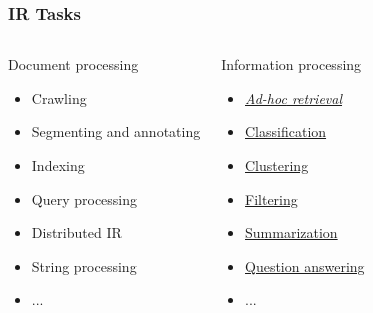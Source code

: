 \documentclass[svgnames]{beamer}
\begin{document}
\begin{frame}
  \frametitle{IR Tasks}

  \begin{columns}[t]


    \begin{block}{Document processing}
      \begin{itemize}
      \item Crawling
      \item Segmenting and annotating
      \item Indexing
      \item Query processing
      \item Distributed IR
      \item String processing
      \item ...
      \end{itemize}
    \end{block}


    \begin{block}{Information processing}
      \begin{itemize}
      \item \emph{\href{http://www.google.com}{\textit{Ad-hoc} retrieval}}
      \item \href{http://www.dmoz.org/}{Classification}
      \item \href{http://vivisimo.com/}{Clustering}
      \item \href{http://www.last.fm/}{Filtering}
      \item \href{http://textsummarization.net}{Summarization}
      \item \href{http://www.ibm.com/watson/}{Question answering}
      \item ...
      \end{itemize}
    \end{block}

  \end{columns}
\end{frame}

\end{document}
